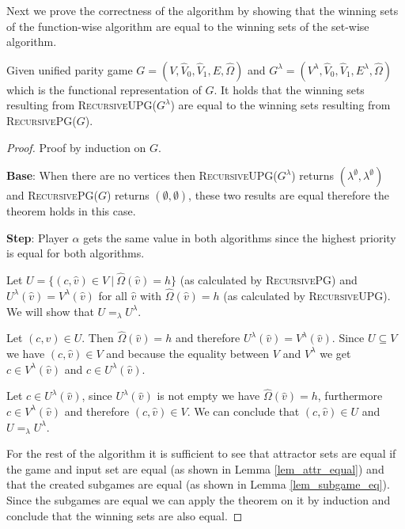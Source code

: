 Next we prove the correctness of the algorithm by showing that the winning sets of the function-wise algorithm are equal to the winning sets of the set-wise algorithm.
\begin{theorem}
	Given unified parity game ${G} = ({V},\hat{V}_0,\hat{V}_1, {E}, \hat{\Omega})$ and $G^\lambda = (V^\lambda, \hat{V}_0, \hat{V}_1, E^\lambda,\hat{\Omega})$ which is the functional representation of $G$. It holds that the winning sets resulting from \textsc{RecursiveUPG(${G}^\lambda$)} are equal to the winning sets resulting from \textsc{RecursivePG(${G}$)}.
	\begin{proof}
		Proof by induction on $G$.
		
		\textbf{Base}: When there are no vertices then \textsc{RecursiveUPG($G^\lambda$)} returns $(\lambda^\emptyset,\lambda^\emptyset)$ and \textsc{RecursivePG($G$)} returns $(\emptyset,\emptyset)$, these two results are equal therefore the theorem holds in this case.
		
		\textbf{Step}: Player $\alpha$ gets the same value in both algorithms since the highest priority is equal for both algorithms.
		
		Let $U = \{(c,\hat{v}) \in V\ |\ \hat{\Omega}(\hat{v}) = h \}$ (as calculated by \textsc{RecursivePG}) and $U^\lambda(\hat{v}) = V^\lambda(\hat{v})$ for all $\hat{v}$ with $\hat{\Omega}(\hat{v}) = h$ (as calculated by \textsc{RecursiveUPG}). We will show that $U =_\lambda U^\lambda$.
		
		Let $(c,\hat{v}) \in U$. Then $\hat{\Omega}(\hat{v}) = h$ and therefore $U^\lambda(\hat{v}) = V^\lambda(\hat{v})$. Since $U \subseteq V$ we have $(c,\hat{v}) \in V$ and because the equality between $V$ and $V^\lambda$ we get $c \in V^\lambda(\hat{v})$ and $c \in U^\lambda(\hat{v})$.
		
		Let $c \in U^\lambda(\hat{v})$, since $U^\lambda(\hat{v})$ is not empty we have $\hat{\Omega}(\hat{v}) = h$, furthermore $c \in V^\lambda(\hat{v})$ and therefore $(c,\hat{v}) \in V$. We can conclude that $(c, \hat{v}) \in U$ and $U =_\lambda U^\lambda$.
		
		For the rest of the algorithm it is sufficient to see that attractor sets are equal if the game and input set are equal (as shown in Lemma \ref{lem_attr_equal}) and that the created subgames are equal (as shown in Lemma \ref{lem_subgame_eq}). Since the subgames are equal we can apply the theorem on it by induction and conclude that the winning sets are also equal.
	\end{proof}
\end{theorem}

